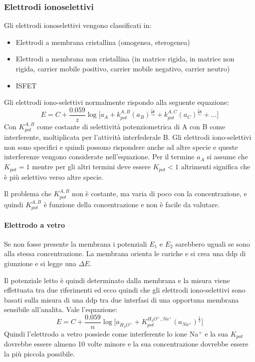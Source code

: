 \subsubsection{Elettrodi ionoselettivi}
Gli elettrodi ionoselettivi vengono classificati in:
\begin{itemize}
\item Elettrodi a membrana cristallina (omogenea, eterogenea)
\item Elettrodi a membrana non cristallina (in matrice rigida, in matrice non rigida, carrier mobile positivo, carrier mobile negativo, carrier neutro)
\item ISFET
\end{itemize}

Gli elettrodi iono-selettivi normalmente rispondo alla seguente equazione:
\[
E = C + \frac{0.059}{z} \log \biggl[a_A + k_{pot}^{A,B} (a_B)^{\frac{z_A}{z_B}} + k_{pot}^{A,C} (a_C)^{\frac{z_A}{z_C}} + \dots \biggr]
\]
Con $K_{pot}^{A,B}$ come costante di selettività potenziometrica di A con B come interferente, moltiplicata per l'attività interfederale B.
Gli elettrodi iono-selettivi non sono specifici e quindi possono rispondere anche ad altre specie e queste interferenze vengono considerate nell'equazione.
Per il termine $a_A$ si assume che $K_{pot}=1$ mentre per gli altri termini deve essere $K_{pot}<1$ altrimenti significa che è più selettivo verso altre specie.

Il problema che $K_{pot}^{A,B}$ non è costante, ma varia di poco con la concentrazione, e quindi $K_{pot}^{A,B}$ è funzione della concentrazione e non è facile da valutare.

\paragraph{Elettrodo a vetro}
Se non fosse presente la membrana i potenziali $E_1$ e $E_2$ sarebbero uguali se sono alla stessa concentrazione.
La membrana orienta le cariche e si crea una ddp di giunzione e si legge una $\Delta E$.


Il potenziale letto è quindi determinato dalla membrana e la misura viene effettuata tra due riferimenti ed ecco quindi che gli elettrodi iono-selettivi sono basati sulla misura di una ddp tra due interfasi di una opportuna membrana sensibile all'analita.
Vale l'equazione:
\[
E = C + \frac{0.059}{n} \log \biggl[a_{H_3O^+} + K_{pot}^{H_3O^+,Na^+} (a_{Na^+})^{\frac{1}{2}} \biggr]
\]
Quindi l'elettrodo a vetro possiede come interferente lo ione Na$^+$ e la sua $K_{pot}$ dovrebbe essere almeno 10 volte minore e la sua concentrazione dovrebbe essere la più piccola possibile.

